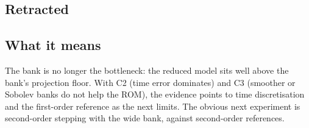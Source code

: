 \subsection*{Retracted}

\subsection*{What it means}
The bank is no longer the bottleneck: the reduced model sits well above the bank's projection floor. With C2 (time error dominates) and C3 (smoother or Sobolev banks do not help the ROM), the evidence points to time discretisation and the first-order reference as the next limits. The obvious next experiment is second-order stepping with the wide bank, against second-order references.
